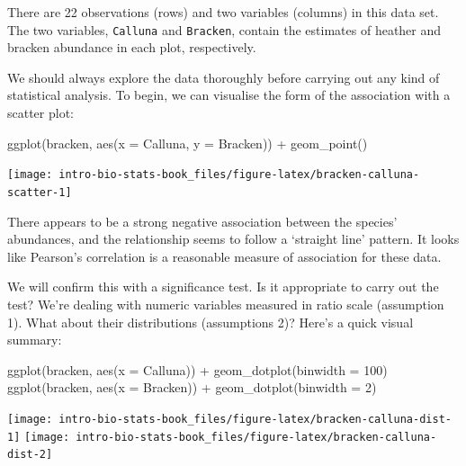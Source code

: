 \documentclass[
]{book}
\newenvironment{Shaded}{\begin{snugshade}}{\end{snugshade}}
\newcommand{\AttributeTok}[1]{\textcolor[rgb]{0.77,0.63,0.00}{#1}}
\newcommand{\DecValTok}[1]{\textcolor[rgb]{0.00,0.00,0.81}{#1}}
\newcommand{\FunctionTok}[1]{\textcolor[rgb]{0.00,0.00,0.00}{#1}}
\newcommand{\NormalTok}[1]{#1}
\newcommand{\SpecialCharTok}[1]{\textcolor[rgb]{0.00,0.00,0.00}{#1}}
\begin{document}
There are 22 observations (rows) and two variables (columns) in this data set. The two variables, \texttt{Calluna} and \texttt{Bracken}, contain the estimates of heather and bracken abundance in each plot, respectively.

We should always explore the data thoroughly before carrying out any kind of statistical analysis. To begin, we can visualise the form of the association with a scatter plot:

\begin{Shaded}
\begin{Highlighting}[]
\FunctionTok{ggplot}\NormalTok{(bracken, }\FunctionTok{aes}\NormalTok{(}\AttributeTok{x =}\NormalTok{ Calluna, }\AttributeTok{y =}\NormalTok{ Bracken)) }\SpecialCharTok{+}
  \FunctionTok{geom\_point}\NormalTok{()}
\end{Highlighting}
\end{Shaded}

\begin{center}\texttt{[image: intro-bio-stats-book\_files/figure-latex/bracken-calluna-scatter-1]} \end{center}

There appears to be a strong negative association between the species' abundances, and the relationship seems to follow a `straight line' pattern. It looks like Pearson's correlation is a reasonable measure of association for these data.

We will confirm this with a significance test. Is it appropriate to carry out the test? We're dealing with numeric variables measured in ratio scale (assumption 1). What about their distributions (assumptions 2)? Here's a quick visual summary:

\begin{Shaded}
\begin{Highlighting}[]
\FunctionTok{ggplot}\NormalTok{(bracken, }\FunctionTok{aes}\NormalTok{(}\AttributeTok{x =}\NormalTok{ Calluna)) }\SpecialCharTok{+} \FunctionTok{geom\_dotplot}\NormalTok{(}\AttributeTok{binwidth =} \DecValTok{100}\NormalTok{)}
\FunctionTok{ggplot}\NormalTok{(bracken, }\FunctionTok{aes}\NormalTok{(}\AttributeTok{x =}\NormalTok{ Bracken)) }\SpecialCharTok{+} \FunctionTok{geom\_dotplot}\NormalTok{(}\AttributeTok{binwidth =} \DecValTok{2}\NormalTok{)}
\end{Highlighting}
\end{Shaded}

\texttt{[image: intro-bio-stats-book\_files/figure-latex/bracken-calluna-dist-1]} \texttt{[image: intro-bio-stats-book\_files/figure-latex/bracken-calluna-dist-2]}
\end{document}
